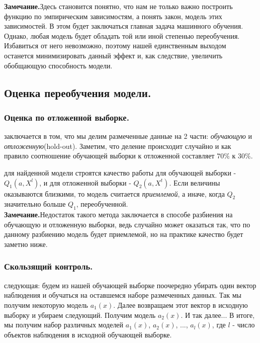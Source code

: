 \documentclass[a4paper,12pt]{article}
\begin{document}
\noindent\textbf{Замечание.}Здесь становится понятно, что нам не только важно построить функцию по эмпирическим зависимостям, а понять закон, модель этих зависимостей. В этом будет заключаться главная задача машинного обучения. Однако, любая модель будет обладать той или иной степенью переобучения. Избавиться от него невозможно, поэтому нашей единственным выходом останется минимизировать данный эффект и, как следствие, увеличить обобщающую способность модели.

\newpage
\subsection{Оценка переобучения модели.}

\subsubsection{Оценка по отложенной выборке.}
 заключается в том, что мы делим размеченные данные на 2 части: \textit{обучающую} и \textit{отложенную}(hold-out). Заметим, что деление происходит случайно и как правило соотношение обучающей выборки к отложенной составляет $70\%$ к $30\%$.

 для найденной модели строятся качество работы для обучающей выборки - $Q_1(a, X^l)$, и для отложенной выборки - $Q_2(a, X^t)$. Если величины оказываются близкими, то модель считается \textit{приемлемой}, а иначе, когда $Q_2$ значительно больше $Q_1$, переобученной.\\

\noindent\textbf{Замечание.}Недостаток такого метода заключается в способе разбиения на обучающую и отложенную выборки, ведь случайно может оказаться так, что по данному разбиению модель будет приемлемой, но на практике качество будет заметно ниже.

\subsubsection{Скользящий контроль.}
 следующая: будем из нашей обучающей выборке поочередно убирать один вектор наблюдения и обучаться на оставшемся наборе размеченных данных. Так мы получим некоторую модель $a_1(x)$. Далее возвращаем этот вектор в исходную выборку и убираем следующий. Получим модель $a_2(x)$. И так далее...
В итоге, мы получим набор различных моделей $a_1(x)$, $a_2(x)$, ..., $a_l(x)$, где $l$ - число объектов наблюдения в исходной обучающей выборке.
\end{document}
